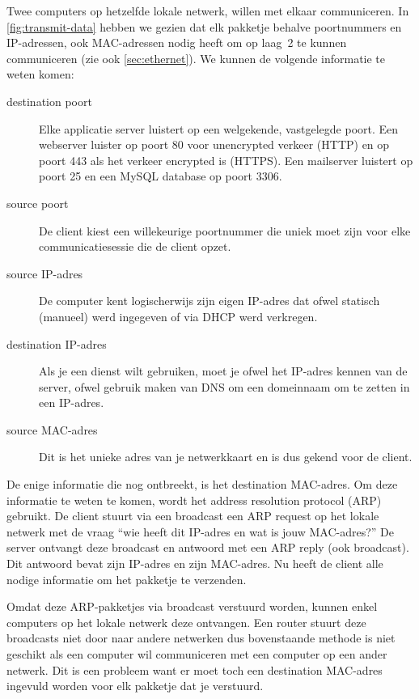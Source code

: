 Twee computers op hetzelfde lokale netwerk, willen met elkaar communiceren.
In \vref{fig:transmit-data} hebben we gezien dat elk pakketje behalve poortnummers en IP-adressen, ook MAC-adressen nodig heeft om op laag~2 te kunnen communiceren (zie ook \vref{sec:ethernet}).
We kunnen de volgende informatie te weten komen:
\begin{description}
\item[destination poort]
   Elke applicatie server luistert op een welgekende, vastgelegde poort.
   Een webserver luister op poort 80 voor unencrypted verkeer (HTTP) en op poort 443 als het verkeer encrypted is (HTTPS).
   Een mailserver luistert op poort 25 en een MySQL database op poort 3306.
\item[source poort]
   De client kiest een willekeurige poortnummer die uniek moet zijn voor elke communicatiesessie die de client opzet.
\item[source IP-adres]
   De computer kent logischerwijs zijn eigen IP-adres dat ofwel statisch (manueel) werd ingegeven of via DHCP werd verkregen.
\item[destination IP-adres]
   Als je een dienst wilt gebruiken, moet je ofwel het IP-adres kennen van de server, ofwel gebruik maken van DNS om een domeinnaam om te zetten in een IP-adres.
\item[source MAC-adres]
   Dit is het unieke adres van je netwerkkaart en is dus gekend voor de client.
\end{description}
De enige informatie die nog ontbreekt, is het destination MAC-adres.
Om deze informatie te weten te komen, wordt het address resolution protocol (ARP) gebruikt.
De client stuurt via een broadcast een ARP request op het lokale netwerk met de vraag ``wie heeft dit IP-adres en wat is jouw MAC-adres?''
De server ontvangt deze broadcast en antwoord met een ARP reply (ook broadcast).
Dit antwoord bevat zijn IP-adres en zijn MAC-adres.
Nu heeft de client alle nodige informatie om het pakketje te verzenden.

Omdat deze ARP-pakketjes via broadcast verstuurd worden, kunnen enkel computers op het lokale netwerk deze ontvangen.
Een router stuurt deze broadcasts niet door naar andere netwerken dus bovenstaande methode is niet geschikt als een computer wil communiceren met een computer op een ander netwerk.
Dit is een probleem want er moet toch een destination MAC-adres ingevuld worden voor elk pakketje dat je verstuurd.